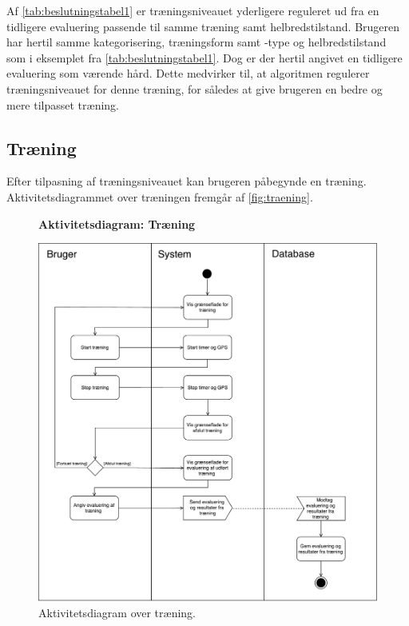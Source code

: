 \noindent
Af \autoref{tab:beslutningstabel1} er træningsniveauet yderligere reguleret ud fra en tidligere evaluering passende til samme træning samt helbredstilstand. Brugeren har hertil samme kategorisering, træningsform samt -type og helbredstilstand som i eksemplet fra \autoref{tab:beslutningstabel1}. Dog er der hertil angivet en tidligere evaluering som værende hård. Dette medvirker til, at algoritmen regulerer træningsniveauet for denne træning, for således at give brugeren en bedre og mere tilpasset træning.


\subsection*{Træning} \label{sec:traening}
Efter tilpasning af træningsniveauet kan brugeren påbegynde en træning. Aktivitetsdiagrammet over træningen fremgår af \autoref{fig:traening}. 

\begin{figure} [H]
\centering
\textbf{Aktivitetsdiagram: Træning}\par\medskip
\includegraphics[width=1\textwidth]{figures/aktivitetsdiagram/Traening}
\caption{Aktivitetsdiagram over træning.}
\label{fig:traening}
\end{figure}


